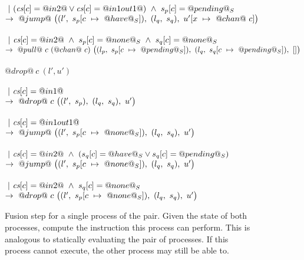 \begin{figure}
\begin{tabbing}
\> \>  \\
\> \> $~|~(\cs[c]=@in2@ \vee \cs[c]=@in1out1@) ~\wedge~ s_p[c]=@pending@_S$ \\
\> \> $\to~@jump@~
      \nextStep
        {l'}
          {\HeapUpdateOne{c}{@have@_S}{s_p}}
        {l_q}
          {s_q}
        {\HeapUpdateOne{x}{@chan@~c}{u'}}
        $ \\

\> \> \\
\> \> $~|~\cs[c]=@in2@ ~\wedge~ s_p[c]=@none@_S ~\wedge~ s_q[c]=@none@_S$ \\
\> \> $\to~@pull@~c~(@chan@~c)~
      \nextStep
        {l_p}
          {\HeapUpdateOne{c}{@pending@_S}{s_p}}
        {l_q}
          {\HeapUpdateOne{c}{@pending@_S}{s_q}}
        {[]}
  $ \\
\\

\> $@drop@~c~(l',u')$ \\
\> \>  \\
\> \> $~|~\cs[c]=@in1@$ \\
\> \> $\to~@drop@~c~
      \nextStep
        {l'}
          {s_p}
        {l_q}
          {s_q}
        {u'}
      $ \\

\> \> \\
\> \> $~|~\cs[c]=@in1out1@$ \\
\> \> $\to~@jump@~
      \nextStep
        {l'}
          {\HeapUpdateOne{c}{@none@_S}{s_p}}
        {l_q}
          {s_q}
        {u'}
      $ \\

\> \> \\
\> \> $~|~\cs[c]=@in2@ ~\wedge~ (s_q[c]=@have@_S \vee s_q[c]=@pending@_S)$ \\
\> \> $\to~@jump@~
      \nextStep
        {l'}
          {\HeapUpdateOne{c}{@none@_S}{s_p}}
        {l_q}
          {s_q}
        {u'}
      $ \\


\> \> \\
\> \> $~|~\cs[c]=@in2@ ~\wedge~ s_q[c]=@none@_S$ \\
\> \> $\to~@drop@~c~
      \nextStep
        {l'}
          {\HeapUpdateOne{c}{@none@_S}{s_p}}
        {l_q}
          {s_q}
        {u'}
      $
\end{tabbing}

\caption{Fusion step for a single process of the pair.
Given the state of both processes, compute the instruction this process can perform.
This is analogous to statically evaluating the pair of processes.
If this process cannot execute, the other process may still be able to.
}
\label{fig:Fusion:Def:Step}
\end{figure}

